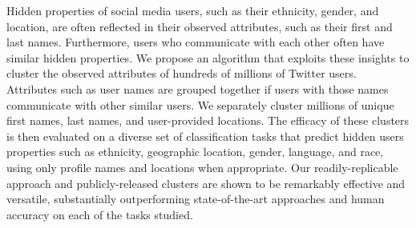 Hidden properties of social media users, such as their ethnicity, gender, and location, are often reflected in their observed attributes, such as their first
 and last names. Furthermore, users who communicate with each other often have
 similar hidden properties. We propose an algorithm that exploits these insights
 to cluster the observed attributes of hundreds of millions of Twitter users.
 Attributes such as user names are grouped together if users with those names
 communicate with other similar users. We separately cluster millions of unique
 first names, last names, and user-provided locations. The efficacy of these
 clusters is then evaluated on a diverse set of classification tasks that
 predict hidden users properties such as ethnicity, geographic location, gender,
 language, and race, using only profile names and locations when appropriate.
 Our readily-replicable approach and publicly-released clusters are shown to be
 remarkably effective and versatile, substantially outperforming
 state-of-the-art approaches and human accuracy on each of the tasks studied.

